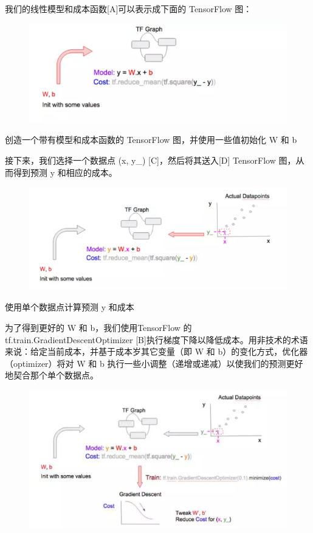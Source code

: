 \documentclass[11pt]{book} %
\begin{document}
我们的线性模型和成本函数[A]可以表示成下面的 TensorFlow 图：

\begin{figure}
\centering
\includegraphics[width=0.7\linewidth]{figures/linear_cost}
\caption{}
\label{fig:linearcost}
\end{figure}


创造一个带有模型和成本函数的 TensorFlow 图，并使用一些值初始化 W 和 b

接下来，我们选择一个数据点 (x, y\_) [C]，然后将其送入[D] TensorFlow 图，从而得到预测 y 和相应的成本。

\begin{figure}
\centering
\includegraphics[width=0.7\linewidth]{figures/linear_prediction}
\caption{}
\label{fig:linearprediction}
\end{figure}


使用单个数据点计算预测 y 和成本

为了得到更好的 W 和 b，我们使用TensorFlow 的 tf.train.GradientDescentOptimizer [B]执行梯度下降以降低成本。用非技术的术语来说：给定当前成本，并基于成本岁其它变量（即 W 和 b）的变化方式，优化器（optimizer）将对 W 和 b 执行一些小调整（递增或递减）以使我们的预测更好地契合那个单个数据点。

\begin{figure}
\centering
\includegraphics[width=0.7\linewidth]{figures/optimization}
\caption{}
\label{fig:optimization}
\end{figure}
\end{document}

